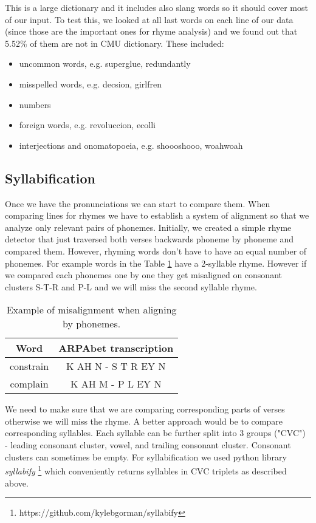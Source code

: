 This is a large dictionary and it includes also slang words so it should cover most of our input. To test this, we looked at all last words on each line of our data (since those are the important ones for rhyme analysis) and we found out that 5.52\% of them are not in CMU dictionary. These included:

\begin{itemize}
	\item uncommon words, e.g. superglue, redundantly
	\item misspelled words, e.g. decsion, girlfren
	\item numbers
	\item foreign words, e.g. revoluccion, ecolli
	\item interjections and onomatopoeia, e.g. shoooshooo, woahwoah
\end{itemize}


\subsection{Syllabification}
Once we have the pronunciations we can start to compare them. When comparing lines for rhymes we have to establish a system of alignment so that we analyze only relevant pairs of phonemes. Initially, we created a simple rhyme detector that just traversed both verses backwards phoneme by phoneme and compared them. However, rhyming words don't have to have an equal number of phonemes. For example words in the Table \ref{phon_misalign_table} have a 2-syllable rhyme. However if we compared each phonemes one by one they get misaligned on consonant clusters S-T-R and P-L and we will miss the second syllable rhyme.

\begin{table}[h!]
	\centering
	\begin{tabular}{c c} 
		Word & ARPAbet transcription \\ [0.5ex] 
		\hline
		constrain & K AH N - S T R EY N \\ 
		complain & K AH M - P L EY N \\
	\end{tabular}
	\caption{Example of misalignment when aligning by phonemes.}
	\label{phon_misalign_table}
\end{table}

We need to make sure that we are comparing corresponding parts of verses otherwise we will miss the rhyme. A better approach would be to compare corresponding syllables. Each syllable can be further split into 3 groups ("CVC") - leading consonant cluster, vowel, and trailing consonant cluster. Consonant clusters can sometimes be empty. For syllabification we used python library \textit{syllabify} \footnote{https://github.com/kylebgorman/syllabify} which conveniently returns syllables in CVC triplets as described above.

